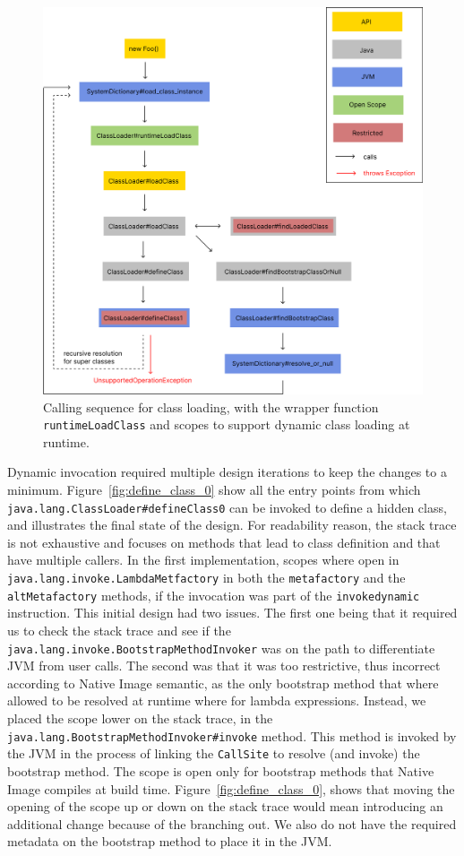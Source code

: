 \begin{figure}
    \centering
    \includegraphics[scale=0.5]{resources/Group 403.png}
    \caption{Calling sequence for class loading, with the wrapper function \texttt{runtimeLoadClass} and scopes to support dynamic class loading at runtime.}
    \label{fig:load_class}
\end{figure}

Dynamic invocation required multiple design iterations to keep the changes to a minimum. Figure~\ref{fig:define_class_0} show all the entry points from which \verb|java.lang.ClassLoader#defineClass0| can be invoked to define a hidden class, and illustrates the final state of the design. For readability reason, the stack trace is not exhaustive and focuses on methods that lead to class definition and that have multiple callers.   
In the first implementation, scopes where open in \verb|java.lang.invoke.LambdaMetfactory| in both the \verb|metafactory| and the \verb|altMetafactory| methods, if the invocation was part of the \verb|invokedynamic| instruction.
This initial design had two issues. The first one being that it required us to check the stack trace and see if the \verb|java.lang.invoke.BootstrapMethodInvoker| was on the path to differentiate JVM from user calls. The second was that it was too restrictive, thus incorrect according to Native Image semantic, as the only bootstrap method that where allowed to be resolved at runtime where for lambda expressions.
Instead, we placed the scope lower on the stack trace, in the \verb|java.lang.BootstrapMethodInvoker#invoke| method. This method is invoked by the JVM in the process of linking the \verb|CallSite| to resolve (and invoke) the bootstrap method. The scope is open only for bootstrap methods that Native Image compiles at build time.
Figure~\ref{fig:define_class_0}, shows that moving the opening of the scope up or down on the stack trace would mean introducing an additional change because of the branching out. We also do not have the required metadata on the bootstrap method to place it in the JVM.   

